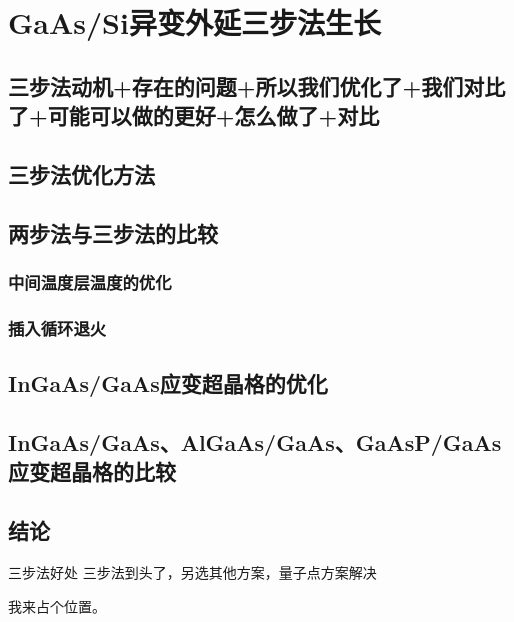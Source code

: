 % 

\chapter{GaAs/Si异变外延三步法生长}
\section{三步法动机+存在的问题+所以我们优化了+我们对比了+可能可以做的更好+怎么做了+对比}

\section{三步法优化方法}

\section{两步法与三步法的比较}

\subsection{中间温度层温度的优化}

\subsection{插入循环退火}

\section{InGaAs/GaAs应变超晶格的优化}

\section{InGaAs/GaAs、AlGaAs/GaAs、GaAsP/GaAs应变超晶格的比较}

\section{结论}

三步法好处
三步法到头了，另选其他方案，量子点方案解决

我来占个位置。\cite{BUPT_Thesis_Format_2004}

\ifx\usechapbib\empty


\fi

